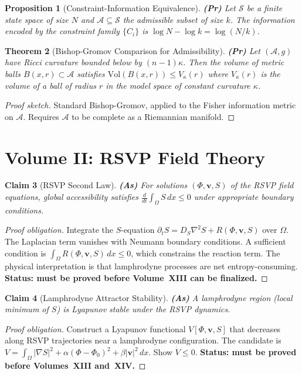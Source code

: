 \documentclass[11pt, a4paper]{book}
\theoremstyle{flyxion}
\newtheorem{theorem}{Theorem}[chapter]
\newtheorem{proposition}[theorem]{Proposition}
\newtheorem{claim}[theorem]{Claim}
\theoremstyle{remark}
\begin{document}
\begin{proposition}[Constraint-Information Equivalence] \textbf{(Pr)}
Let $\mathcal{S}$ be a finite state space of size $N$ and
$\mathcal{A} \subseteq \mathcal{S}$ the admissible subset of size
$k$. The information encoded by the constraint family
$\{C_i\}$ is $\log N - \log k = \log(N/k)$.
\end{proposition}

\begin{theorem}[Bishop-Gromov Comparison for Admissibility] \textbf{(Pr)}
Let $(\mathcal{A}, g)$ have Ricci curvature bounded below by
$(n-1)\kappa$. Then the volume of metric balls
$B(x,r) \subset \mathcal{A}$ satisfies
$\mathrm{Vol}(B(x,r)) \leq V_\kappa(r)$
where $V_\kappa(r)$ is the volume of a ball of radius $r$ in the
model space of constant curvature $\kappa$.
\end{theorem}
\begin{proof}[Proof sketch]
Standard Bishop-Gromov, applied to the Fisher information metric
on $\mathcal{A}$. Requires $\mathcal{A}$ to be complete as a
Riemannian manifold.
\end{proof}

\section{Volume II: RSVP Field Theory}

\begin{claim}[RSVP Second Law] \textbf{(As)}
For solutions $(\Phi, \mathbf{v}, S)$ of the RSVP field equations,
global accessibility satisfies
$\frac{d}{dt}\int_\Omega S\,dx \leq 0$
under appropriate boundary conditions.
\end{claim}
\begin{proof}[Proof obligation]
Integrate the $S$-equation $\partial_t S = D_S\nabla^2 S +
R(\Phi,\mathbf{v},S)$ over $\Omega$. The Laplacian term vanishes
with Neumann boundary conditions. A sufficient condition is
$\int_\Omega R(\Phi,\mathbf{v},S)\,dx \leq 0$, which constrains the
reaction term. The physical interpretation is that lamphrodyne
processes are net entropy-consuming. \textbf{Status: must be proved
before Volume~XIII can be finalized.}
\end{proof}

\begin{claim}[Lamphrodyne Attractor Stability] \textbf{(As)}
A lamphrodyne region (local minimum of $S$) is Lyapunov stable
under the RSVP dynamics.
\end{claim}
\begin{proof}[Proof obligation]
Construct a Lyapunov functional $V[\Phi,\mathbf{v},S]$ that decreases
along RSVP trajectories near a lamphrodyne configuration. The
candidate is $V = \int_\Omega |\nabla S|^2 + \alpha(\Phi - \Phi_0)^2
+ \beta|\mathbf{v}|^2\,dx$. Show $\dot V \leq 0$. \textbf{Status:
must be proved before Volumes~XIII and~XIV.}
\end{proof}
\end{document}
